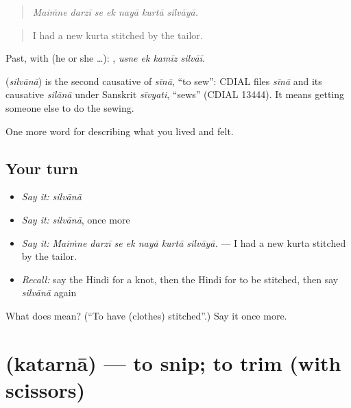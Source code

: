 \begin{quote}
      
\end{quote}

\begin{quote}
\emph{Maiṁne darzī se ek nayā kurtā silvāyā.}
\end{quote}

\begin{quote}
I had a new kurta stitched by the tailor.
\end{quote}

Past, with  (he or she …):    , \emph{usne ek kamīz silvāī}.

\begin{cousinweb}
\textbf{} (\emph{silvānā}) is the second causative of \emph{sīnā}, \textquotedblleft{}to sew\textquotedblright{}: CDIAL files \emph{sīnā} and its causative \emph{silānā} under Sanskrit \emph{sīvyati}, \textquotedblleft{}sews\textquotedblright{} (CDIAL 13444). It means getting someone else to do the sewing.
\end{cousinweb}

\begin{grammarlens}[title={What you've built}]
One more word for describing what you lived and felt.
\end{grammarlens}

\subsection*{Your turn}
\begin{itemize}
\raggedright
  \item \emph{Say it:} \emph{silvānā}
  \item \emph{Say it:} \emph{silvānā}, once more
  \item \emph{Say it:} \emph{Maiṁne darzī se ek nayā kurtā silvāyā.} — I had a new kurta stitched by the tailor.
  \item \emph{Recall:} say the Hindi for a knot, then the Hindi for to be stitched, then say \emph{silvānā} again
\end{itemize}

\begin{tcolorbox}[breakable,colback=teal!4,colframe=teal!35!black,title={Before you move on}]
What does  mean? (\textquotedblleft{}To have (clothes) stitched\textquotedblright{}.) Say it once more.
\end{tcolorbox}
\section[\texorpdfstring{\hi{कतरना} (katarnā)}{कतरना (katarnā)}]{ (katarnā) — to snip; to trim (with scissors)}


